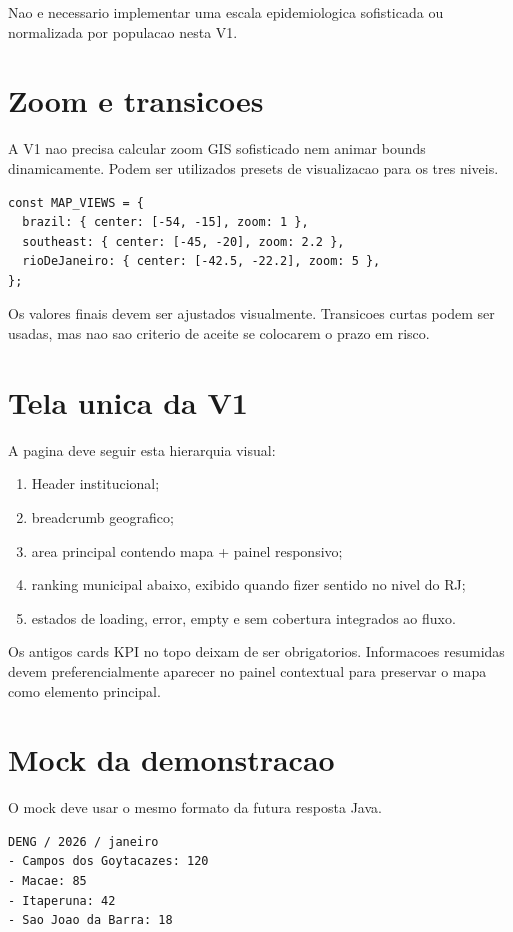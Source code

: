 \documentclass[12pt,a4paper]{article}
\begin{document}
Nao e necessario implementar uma escala epidemiologica sofisticada ou normalizada por populacao nesta V1.

\section{Zoom e transicoes}

A V1 nao precisa calcular zoom GIS sofisticado nem animar bounds dinamicamente. Podem ser utilizados presets de visualizacao para os tres niveis.

\begin{lstlisting}
const MAP_VIEWS = {
  brazil: { center: [-54, -15], zoom: 1 },
  southeast: { center: [-45, -20], zoom: 2.2 },
  rioDeJaneiro: { center: [-42.5, -22.2], zoom: 5 },
};
\end{lstlisting}

Os valores finais devem ser ajustados visualmente. Transicoes curtas podem ser usadas, mas nao sao criterio de aceite se colocarem o prazo em risco.

\section{Tela unica da V1}

A pagina deve seguir esta hierarquia visual:

\begin{enumerate}[leftmargin=*]
    \item Header institucional;
    \item breadcrumb geografico;
    \item area principal contendo mapa + painel responsivo;
    \item ranking municipal abaixo, exibido quando fizer sentido no nivel do RJ;
    \item estados de loading, error, empty e sem cobertura integrados ao fluxo.
\end{enumerate}

Os antigos cards KPI no topo deixam de ser obrigatorios. Informacoes resumidas devem preferencialmente aparecer no painel contextual para preservar o mapa como elemento principal.

\section{Mock da demonstracao}

O mock deve usar o mesmo formato da futura resposta Java.

\begin{lstlisting}
DENG / 2026 / janeiro
- Campos dos Goytacazes: 120
- Macae: 85
- Itaperuna: 42
- Sao Joao da Barra: 18
\end{lstlisting}
\end{document}
